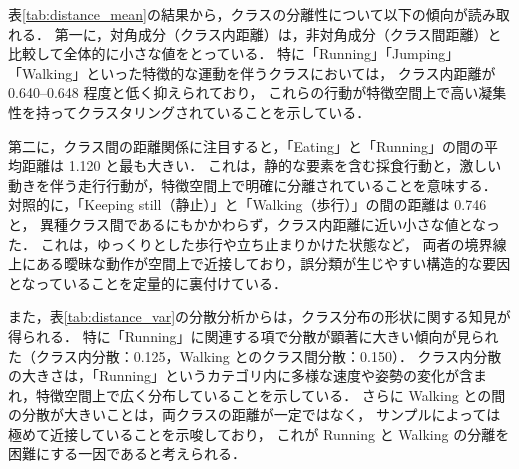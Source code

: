 \begin{table}[t]
  \centering
  \caption{各行動クラス間の特徴空間上での距離分散}
  \label{tab:distance_var}
\end{table}

表\ref{tab:distance_mean}の結果から，クラスの分離性について以下の傾向が読み取れる．
第一に，対角成分（クラス内距離）は，非対角成分（クラス間距離）と比較して全体的に小さな値をとっている．
特に「Running」「Jumping」「Walking」といった特徴的な運動を伴うクラスにおいては，
クラス内距離が 0.640--0.648 程度と低く抑えられており，
これらの行動が特徴空間上で高い凝集性を持ってクラスタリングされていることを示している．

第二に，クラス間の距離関係に注目すると，「Eating」と「Running」の間の平均距離は 1.120 と最も大きい．
これは，静的な要素を含む採食行動と，激しい動きを伴う走行行動が，特徴空間上で明確に分離されていることを意味する．
対照的に，「Keeping still（静止）」と「Walking（歩行）」の間の距離は 0.746 と，
異種クラス間であるにもかかわらず，クラス内距離に近い小さな値となった．
これは，ゆっくりとした歩行や立ち止まりかけた状態など，
両者の境界線上にある曖昧な動作が空間上で近接しており，誤分類が生じやすい構造的な要因となっていることを定量的に裏付けている．

また，表\ref{tab:distance_var}の分散分析からは，クラス分布の形状に関する知見が得られる．
特に「Running」に関連する項で分散が顕著に大きい傾向が見られた（クラス内分散：0.125，Walking とのクラス間分散：0.150）．
クラス内分散の大きさは，「Running」というカテゴリ内に多様な速度や姿勢の変化が含まれ，特徴空間上で広く分布していることを示している．
さらに Walking との間の分散が大きいことは，両クラスの距離が一定ではなく，
サンプルによっては極めて近接していることを示唆しており，
これが Running と Walking の分離を困難にする一因であると考えられる．

